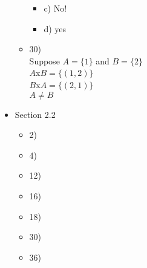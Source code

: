 \documentclass{article}
\begin{document}
\begin{itemize}
\begin{itemize}
\begin{itemize}
    \item
    c) No!
    \item
    d) yes
    \end{itemize}
    \item
    30)\\
    Suppose $A=\{1\}$ and $B=\{2\}$\\
    $A$x$B=\{(1,2)\}$\\
    $B$x$A=\{(2,1)\}$\\
    $A\ne B$
  \end{itemize}
  \item
  Section 2.2
  \begin{itemize}
  \item
  2)
  \item
  4)
  \item
  12)
  \item
  16)
  \item
  18)
  \item
  30)
  \item
  36)
  \end{itemize}
\end{itemize}
\end{document}

